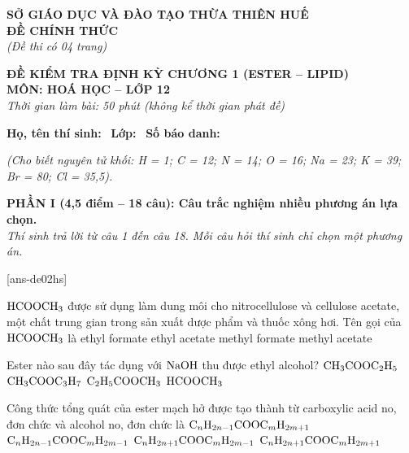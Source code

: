 \documentclass[12pt,a4paper]{article}
\begin{document}
\thispagestyle{firstpage}

\noindent
\begin{minipage}[t]{0.44\textwidth}
	\centering\fontsize{10pt}{12pt}\selectfont
	\textbf{SỞ GIÁO DỤC VÀ ĐÀO TẠO THỪA THIÊN HUẾ}\\
	\textbf{ĐỀ CHÍNH THỨC}\\
	\textit{(Đề thi có 04 trang)}
\end{minipage}\hfill
\begin{minipage}[t]{0.54\textwidth}
	\centering\small
	\textbf{ĐỀ KIỂM TRA ĐỊNH KỲ CHƯƠNG 1 (ESTER -- LIPID)}\\
	\textbf{MÔN: HOÁ HỌC -- LỚP 12}\\
	\textit{Thời gian làm bài: 50 phút (không kể thời gian phát đề)}\\
\end{minipage}

\smallskip
\noindent\hrulefill
\smallskip

\noindent\textbf{Họ, tên thí sinh:} \dotfill\ \textbf{Lớp:} \dotfill\ \textbf{Số báo danh:} \dotfill

\smallskip
\noindent\textit{(Cho biết nguyên tử khối: H = 1; C = 12; N = 14; O = 16; Na = 23; K = 39; Br = 80; Cl = 35,5).}
\smallskip

\noindent
\textbf{PHẦN I (4,5 điểm -- 18 câu): Câu trắc nghiệm nhiều phương án lựa chọn.}\\
\textit{Thí sinh trả lời từ câu 1 đến câu 18. Mỗi câu hỏi thí sinh chỉ chọn một phương án.}

[ans-de02hs]

\begin{ex}
$\ce{HCOOCH3}$ được sử dụng làm dung môi cho nitrocellulose và cellulose acetate, một chất trung gian trong sản xuất dược phẩm và thuốc xông hơi. Tên gọi của $\ce{HCOOCH3}$ là
\choice
{ethyl formate}
{ethyl acetate}
{methyl formate}
{methyl acetate}
\loigiai{}
\end{ex}

\begin{ex}
Ester nào sau đây tác dụng với $\ce{NaOH}$ thu được ethyl alcohol?
\choice
{$\ce{CH3COOC2H5}$}
{$\ce{CH3COOC3H7}$}
{$\ce{C2H5COOCH3}$}
{$\ce{HCOOCH3}$}
\loigiai{}
\end{ex}

\begin{ex}
Công thức tổng quát của ester mạch hở được tạo thành từ carboxylic acid no, đơn chức và alcohol no, đơn chức là
\choice
{$\ce{C_{n}H_{2n-1}COOC_{m}H_{2m+1}}$}
{$\ce{C_{n}H_{2n-1}COOC_{m}H_{2m-1}}$}
{$\ce{C_{n}H_{2n+1}COOC_{m}H_{2m-1}}$}
{$\ce{C_{n}H_{2n+1}COOC_{m}H_{2m+1}}$}
\loigiai{}
\end{ex}
\end{document}
